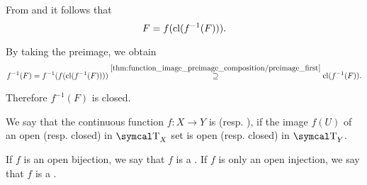 \begin{RefListProof}
    From  and  it follows that
    \begin{equation*}
      F = f(\operatorname{cl}(f^{-1}(F))).
    \end{equation*}

    By taking the preimage, we obtain
    \begin{equation*}
      f^{-1}(F)
      =
      f^{-1}(f(\operatorname{cl}(f^{-1}(F))))
      \overset {\ref{thm:function_image_preimage_composition/preimage_first}} \supseteq
      \operatorname{cl}(f^{-1}(F)).
    \end{equation*}

    Therefore \( f^{-1}(F) \) is closed.
\end{RefListProof}

\begin{Definition}\label{def:homeomorphism}
  We say that the continuous function \( f: X \to Y \) is  (resp. ), if the image \( f(U) \) of an open (resp. closed) in \( \CT_X \) set is open (resp. closed) in \( \CT_Y \).

  If \( f \) is an open bijection, we say that \( f \) is a . If \( f \) is only an open injection, we say that \( f \) is a .
\end{Definition}

